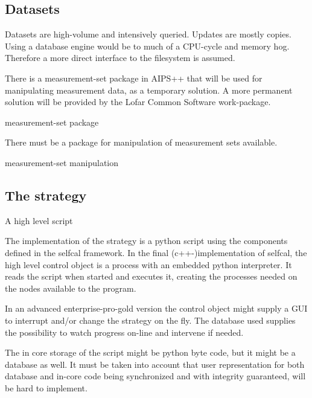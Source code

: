 \documentclass[]{lofar}
\begin{document}
    \subsection{Datasets}
    \label{subsec:Datasets}\hypertarget{subsec:Datasets}{}%

      Datasets are high-volume and intensively queried. Updates are
      mostly copies. Using a database engine would be to much of a
      CPU-cycle and memory hog. Therefore a more direct interface to
      the filesystem is assumed.

      \begin{assumption}
        There is a measurement-set package in AIPS++ that will be used
        for manipulating measurement data, as a temporary solution. A
        more permanent solution will be provided by the Lofar Common
        Software work-package.
        \caption{measurement-set package\label{ass:aips++}}
      \end{assumption}

      \begin{prerequisite}
        There must be a package for manipulation of measurement sets available.
        \caption{measurement-set manipulation\label{pre:aips++}}
      \end{prerequisite}

    \subsection{The strategy}{A high level script}
    \label{subsec:strategy}\hypertarget{subsec:strategy}{}

      The implementation of the strategy is a python script using the
      components defined in the selfcal framework. In the final
      (c++-)implementation of selfcal, the high level control object
      is a process with an embedded python interpreter. It reads the
      script when started and executes it, creating the processes
      needed on the nodes available to the program.

      In an advanced enterprise-pro-gold version the control object
      might supply a GUI to interrupt and/or change the strategy on
      the fly. The database used supplies the possibility to watch
      progress on-line and intervene if needed.

      The in core storage of the script might be python byte code, but
      it might be a database as well. It must be taken into account
      that user representation for both database and in-core code
      being synchronized and with integrity guaranteed, will be hard
      to implement.
\end{document}
